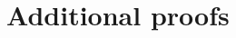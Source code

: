\documentclass[twoside,11pt]{article}
\begin{document}

\section{Additional proofs}


\end{document}
